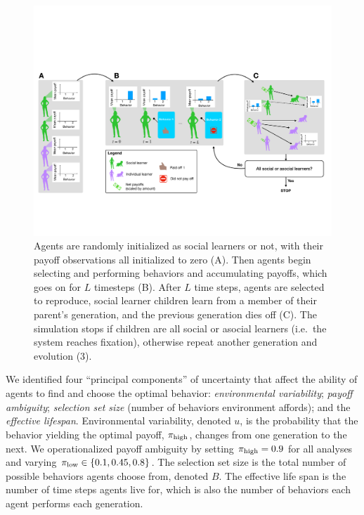 \documentclass[letterpaper,11.5pt]{scrartcl}
\begin{document}
\begin{figure}
  \caption{Agents are randomly initialized as social learners or not, with their
  payoff observations all initialized to zero (A). Then agents begin selecting
and performing behaviors and accumulating payoffs, which goes on for $L$
timesteps (B). After $L$ time steps, agents are selected to reproduce,
social learner children learn from a member of their parent's generation, and
the previous generation dies off (C). The simulation stops if children are all
social or asocial learners (i.e.\ the system reaches fixation), 
otherwise repeat another generation and evolution (3).}
  \label{fig:schematic}
  \centering
    \includegraphics[width=\textwidth]{Figures/IntraInterGenerationalDynamics.pdf}
\end{figure}


We identified four ``principal components'' of uncertainty that affect the
ability of agents to find and choose the optimal behavior: 
\emph{environmental variability}; \emph{payoff ambiguity}; \emph{selection set size}
(number of behaviors environment affords); and the \emph{effective lifespan}.
Environmental variability, denoted $u$, is the probability that the behavior
yielding the optimal payoff, $\pi_{\mathrm{high}}$, changes from one generation to the next.
We operationalized payoff ambiguity by setting $\pi_{\mathrm{high}} = 0.9$ for all analyses
and varying $\pi_{\mathrm{low}} \in \{0.1, 0.45, 0.8\}$. The selection set size is the
total number of possible behaviors agents choose from, denoted $B$. The 
effective life span is the number of time steps agents live for, which is
also the number of behaviors each agent performs each generation.
\end{document}
